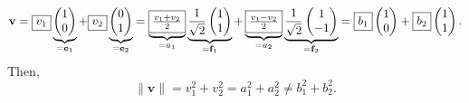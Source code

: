 \documentclass[letterpaper, reqno,11pt]{article}
\begin{document}
\[ \mathbf v = \fbox{$v_1$} \underbrace{\begin{pmatrix} 1 \\ 0 \end{pmatrix}}_{= \mathbf e_1} + \fbox{$v_2$} \underbrace{\begin{pmatrix} 0 \\ 1 \end{pmatrix}}_{= \mathbf e_2} = \underbrace{\fbox{$\frac{v_1 + v_2}{2}$}}_{= a_1} \underbrace{\frac{1}{\sqrt 2} \begin{pmatrix} 1 \\ 1 \end{pmatrix}}_{= \mathbf f_1} + \underbrace{\fbox{$\frac{v_1 - v_2}{2}$}}_{= a_2} \underbrace{\frac{1}{\sqrt 2} \begin{pmatrix} 1 \\ -1 \end{pmatrix}}_{= \mathbf f_2} = \fbox{$b_1$} \begin{pmatrix} 1 \\ 0 \end{pmatrix} + \fbox{$b_2$} \begin{pmatrix} 1 \\ 1 \end{pmatrix}. \]
Then,
\[ \lVert \mathbf v \rVert = v_1^2 + v_2^2 = a_1^2 + a_2^2 \neq b_1^2 + b_2^2. \]
\end{document}
